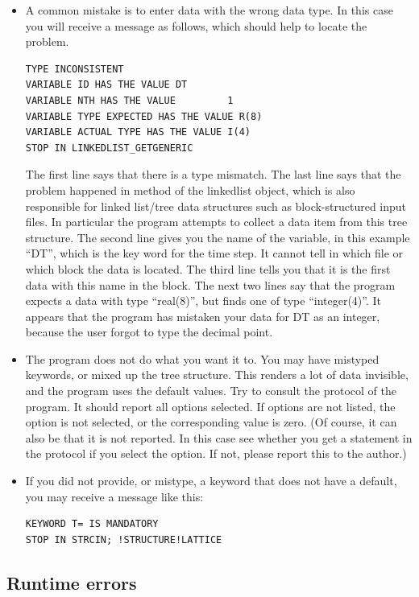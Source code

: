 \documentclass[final,12pt]{article}
\begin{document}
{{{{{{\begin{itemize}
\item A common mistake is to enter data with the wrong data type.
  In this case you will receive a message as follows, which should help
  to locate the problem.
\begin{verbatim}
TYPE INCONSISTENT
VARIABLE ID HAS THE VALUE DT
VARIABLE NTH HAS THE VALUE         1
VARIABLE TYPE EXPECTED HAS THE VALUE R(8)
VARIABLE ACTUAL TYPE HAS THE VALUE I(4)
STOP IN LINKEDLIST_GETGENERIC
\end{verbatim}
The first line says that there is a type mismatch. The last line
says that the problem happened in method of the linkedlist object,
which is also responsible for linked list/tree data structures such as
block-structured input files. In particular the program attempts to
collect a data item from this tree structure.  The second line gives
you the name of the variable, in this example ``DT'', which is the key
word for the time step. It cannot tell in which file or which block
the data is located. The third line tells you that it is the first
data with this name in the block. The next two lines say that the
program expects a data with type ``real(8)'', but finds one of type
``integer(4)''. It appears that the program has mistaken your data for
DT as an integer, because the user forgot to type the decimal point.
\item The program does not do what you want it to. You may have mistyped
  keywords, or mixed up the tree structure. This renders a lot of data
  invisible, and the program uses the default values. Try to consult
  the protocol of the program. It should report all options selected.
  If options are not listed, the option is not selected, or the
  corresponding value is zero. (Of course, it can also be that it is
  not reported. In this case see whether you get a statement in the
  protocol if you select the option. If not, please report this to the
  author.)
\item If you did not provide, or mistype, a keyword that does not have
  a default, you may receive a message like this:
\begin{verbatim}
KEYWORD T= IS MANDATORY
STOP IN STRCIN; !STRUCTURE!LATTICE
\end{verbatim}

\end{itemize}



\subsection{Runtime errors}

}}}}}}
\end{document}
